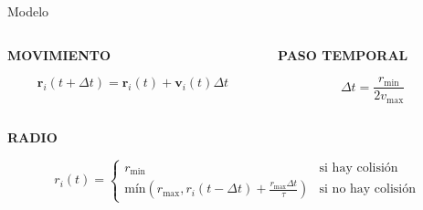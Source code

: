 \documentclass[aspectratio=169]{beamer}
\begin{document}
\begin{frame}{Modelo}
    \begin{columns}
        \begin{column}{0.5\textwidth}
            {\centering\textbf{MOVIMIENTO}\par}
            \vspace{0.5em}
            \[
                \mathbf{r}_i(t + \Delta t) = \mathbf{r}_i(t) + \mathbf{v}_i(t)\Delta t
            \]
        \end{column}
        \begin{column}{0.5\textwidth}
            {\centering\textbf{PASO TEMPORAL}\par}
            \vspace{0.5em}
            \[
                \Delta t = \frac{r_{\text{min}}}{2v_{\text{max}}}
            \]
        \end{column}
    \end{columns}
    
    \vspace{1em}
    {\centering\textbf{RADIO}\par}
    \vspace{0.5em}
    \[
        r_i(t) = \begin{cases}
            r_{\text{min}} & \text{si hay colisión} \\
            \text{mín}(r_{\text{max}}, r_i(t - \Delta t) + \frac{r_{\text{max}}\Delta t}{\tau}) & \text{si no hay colisión}
        \end{cases}
    \]
\end{frame}
\end{document}
